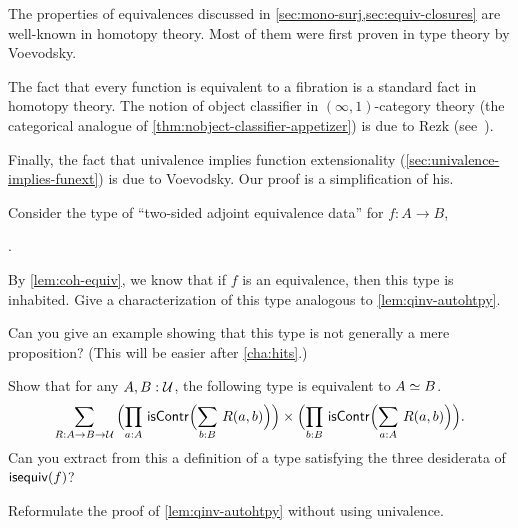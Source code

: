 The properties of equivalences discussed in \cref{sec:mono-surj,sec:equiv-closures} are well-known in homotopy theory.
Most of them were first proven in type theory by Voevodsky.

The fact that every function is equivalent to a fibration is a standard fact in homotopy theory.
The notion of object classifier
%
%
in $(\infty,1)$-category
%
theory (the categorical analogue of \cref{thm:nobject-classifier-appetizer}) is due to Rezk (see~\cite{Rezk05,lurie:higher-topoi}).

Finally, the fact that univalence implies function extensionality (\cref{sec:univalence-implies-funext}) is due to Voevodsky.
Our proof is a simplification of his.

\sectionExercises

\begin{ex}\label{ex:two-sided-adjoint-equivalences}
  Consider the type of ``two-sided adjoint equivalence data'' for $f:A\to B$,
  \begin{narrowmultline*}
    \narrowbreak
     \times
    .
  \end{narrowmultline*}
  By \cref{lem:coh-equiv}, we know that if $f$ is an equivalence, then this type is inhabited.
  Give a characterization of this type analogous to \cref{lem:qinv-autohtpy}.

  Can you give an example showing that this type is not generally a mere proposition?
  (This will be easier after \cref{cha:hits}.)
\end{ex}

\begin{ex}\label{ex:symmetric-equiv}
  Show that for any $A,B:\mathcal{U}$, the following type is equivalent to $A \simeq B$.
  \begin{equation*}
    \sm{R:A\to B\to \type}
    \Parens{\prd{a:A} \iscontr\Parens{\sm{b:B} R(a,b)}} \times
    \Parens{\prd{b:B} \iscontr\Parens{\sm{a:A} R(a,b)}}.
  \end{equation*}
  Can you extract from this a definition of a type satisfying the three desiderata of $\mathsf{isequiv}(f)$?
\end{ex}

\begin{ex} \label{ex:qinv-autohtpy-no-univalence}
  Reformulate the proof of \cref{lem:qinv-autohtpy} without using univalence.
\end{ex}

